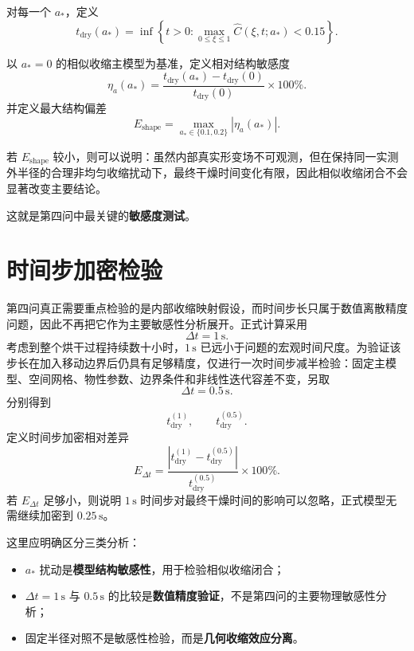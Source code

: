 \documentclass[UTF8,a4paper,12pt]{ctexart}
\begin{document}
对每一个 $a_*$，定义
\begin{equation}
t_{\mathrm{dry}}(a_*)
=
\inf\left\{
t>0:
\max_{0\le\xi\le1}\widehat C(\xi,t;a_*)<0.15
\right\}.
\label{eq:tdrya}
\end{equation}

以 $a_*=0$ 的相似收缩主模型为基准，定义相对结构敏感度
\begin{equation}
\boxed{
\eta_a(a_*)
=
\frac{t_{\mathrm{dry}}(a_*)-t_{\mathrm{dry}}(0)}
{t_{\mathrm{dry}}(0)}\times100\%.
}
\label{eq:etaa}
\end{equation}
并定义最大结构偏差
\begin{equation}
E_{\mathrm{shape}}
=
\max_{a_*\in\{0.1,0.2\}}
|\eta_a(a_*)|.
\label{eq:Eshape}
\end{equation}

若 $E_{\mathrm{shape}}$ 较小，则可以说明：虽然内部真实形变场不可观测，但在保持同一实测外半径的合理非均匀收缩扰动下，最终干燥时间变化有限，因此相似收缩闭合不会显著改变主要结论。

这就是第四问中最关键的\textbf{敏感度测试}。

\section{时间步加密检验}

第四问真正需要重点检验的是内部收缩映射假设，而时间步长只属于数值离散精度问题，因此不再把它作为主要敏感性分析展开。正式计算采用
\begin{equation}
\boxed{\Delta t=1\,\mathrm{s}}.
\label{eq:dtmain}
\end{equation}
考虑到整个烘干过程持续数十小时，$1\,\mathrm{s}$ 已远小于问题的宏观时间尺度。为验证该步长在加入移动边界后仍具有足够精度，仅进行一次时间步减半检验：固定主模型、空间网格、物性参数、边界条件和非线性迭代容差不变，另取
\begin{equation}
\Delta t=0.5\,\mathrm{s}.
\label{eq:dthalf}
\end{equation}
分别得到
\[
t_{\mathrm{dry}}^{(1)},\qquad t_{\mathrm{dry}}^{(0.5)}.
\]
定义时间步加密相对差异
\begin{equation}
\boxed{
E_{\Delta t}
=
\frac{
\left|t_{\mathrm{dry}}^{(1)}-t_{\mathrm{dry}}^{(0.5)}\right|
}{
 t_{\mathrm{dry}}^{(0.5)}
}\times100\%.
}
\label{eq:Edt}
\end{equation}
若 $E_{\Delta t}$ 足够小，则说明 $1\,\mathrm{s}$ 时间步对最终干燥时间的影响可以忽略，正式模型无需继续加密到 $0.25\,\mathrm{s}$。

这里应明确区分三类分析：
\begin{itemize}
    \item $a_*$ 扰动是\textbf{模型结构敏感性}，用于检验相似收缩闭合；
    \item $\Delta t=1\,\mathrm{s}$ 与 $0.5\,\mathrm{s}$ 的比较是\textbf{数值精度验证}，不是第四问的主要物理敏感性分析；
    \item 固定半径对照不是敏感性检验，而是\textbf{几何收缩效应分离}。
\end{itemize}
\end{document}
